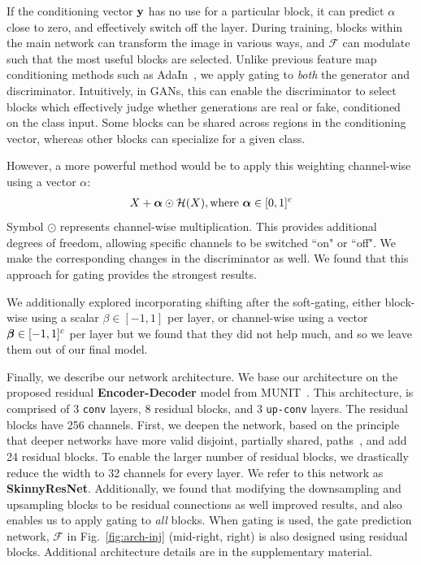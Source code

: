 If the conditioning vector ${\bf y}$ has no use for a particular block, it can predict $\alpha$ close to zero, and effectively switch off the layer.
During training, blocks within the main network can transform the image in various ways, and $\mathcal{F}$ can modulate such that the most useful blocks are selected. 
Unlike previous feature map conditioning methods such as AdaIn~\cite{ulyanovinstance}, we apply gating to \emph{both} the generator and discriminator. 
Intuitively, in GANs, this can enable the discriminator to select blocks which effectively judge whether generations are real or fake, conditioned on the class input.
Some blocks can be shared across regions in the conditioning vector, whereas other blocks can specialize for a given class.

However, a more powerful method would be to apply this weighting channel-wise using a vector {\boldmath$\alpha$}: %
\begin{align}
X + \mbox{\boldmath $\alpha$} \odot \mathcal{H}(X), \text{where } \mbox{\boldmath $\alpha$} \in [0,1]^c 
\end{align}
Symbol $\odot$ represents channel-wise multiplication. This provides additional degrees of freedom, allowing specific channels to be switched ``on" or ``off". 
We make the corresponding changes in the discriminator as well. 
We found that this approach for gating provides the strongest results. 

We additionally explored incorporating shifting after the soft-gating, either block-wise using a scalar $\beta \in [-1,1]$ per layer, or channel-wise using a vector $\mbox{\boldmath $\beta$} \in [-1, 1]^c$ per layer but we found that they did not help much, and so we leave them out of our final model.

Finally, we describe our network architecture. 
We base our architecture on the proposed residual \textbf{Encoder-Decoder} model from MUNIT~\cite{huang2018multimodal}.
This architecture, is comprised of 3 \texttt{conv} layers, 8 residual blocks, and 3 \texttt{up-conv} layers. The residual blocks have 256 channels. 
First, we deepen the network, based on the principle that deeper networks have more valid disjoint, partially shared, paths~\cite{veit2016residual}, and add 24 residual blocks. 
To enable the larger number of residual blocks, we drastically reduce the width to 32 channels for every layer. 
We refer to this network as \textbf{SkinnyResNet}. 
Additionally, we found that modifying the downsampling and upsampling blocks to be residual connections as well improved results, and also enables us to apply gating to {\em all} blocks. 
When gating is used, the gate prediction network, $\mathcal{F}$ in Fig.~\ref{fig:arch-inj} (mid-right, right) is also designed using residual blocks. Additional architecture details are in the supplementary material. 



